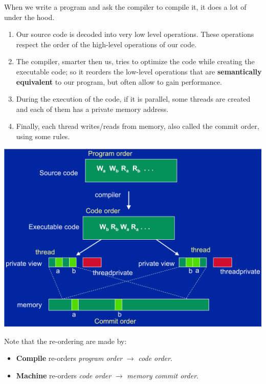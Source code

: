 \begin{remarkbox}
    When we write a program and ask the compiler to compile it, it does a lot of  under the hood.
    \begin{enumerate}
        \item Our source code is decoded into very low level operations. These operations respect the order of the high-level operations of our code.
        \item The compiler, smarter then us, tries to optimize the code while creating the executable code; so it reorders the low-level operations that are \textbf{semantically equivalent} to our program, but often allow to gain performance.
        \item During the execution of the code, if it is parallel, some threads are created and each of them has a private memory address.
        \item Finally, each thread writes/reads from memory, also called the commit order, using some rules.
    \end{enumerate}
    \begin{center}
        \includegraphics[width=\textwidth]{img/memory-model-2.pdf}
    \end{center}

    Note that the re-ordering are made by:
    \begin{itemize}
        \item \textbf{Compile} re-orders \emph{program order} $\rightarrow$ \emph{code order}.
        \item \textbf{Machine} re-orders \emph{code order} $\rightarrow$ \emph{memory commit order}.
    \end{itemize}
\end{remarkbox}

